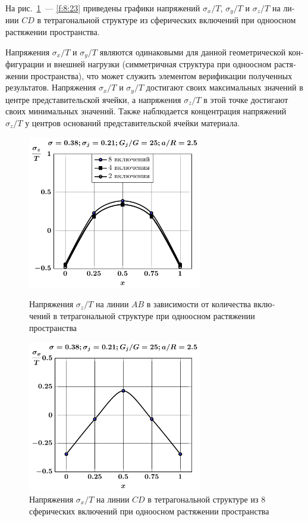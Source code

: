 \begin{russian}
На рис.~\ref{f:8:21}~--- \ref{f:8:23} приведены графики напряжений $\sigma_x/T$, $\sigma_y/T$ и $\sigma_z/T$ на линии $CD$ в тетрагональной структуре из сферических включений при одноосном растяжении пространства.{\sloppy\par}

Напряжения $\sigma_x/T$ и $\sigma_y/T$ являются одинаковыми для данной геометрической конфигурации и внешней нагрузки (симметричная структура при одноосном растяжении пространства), что может служить элементом верификации полученных результатов. Напряжения $\sigma_x/T$ и $\sigma_y/T$ достигают своих максимальных значений в центре представительской ячейки, а напряжения $\sigma_z/T$ в этой точке достигают своих минимальных значений. Также наблюдается концентрация напряжений $\sigma_z/T$ у центров оснований представительской ячейки материала.

\begin{figure}[h!]
\centering\footnotesize
\parbox[b]{7.5cm}{\centering\includegraphics[width=7.6cm]{inc8-4-2-a25-d95-g25-sig_z-spheres-tension1.pdf}
\caption{Напряжения $\sigma_z/T$ на линии  $AB$ в зависимости от количества включений в тетрагональной структуре при одноосном растяжении пространства
\label{f:8:20}}}\hfil\hfil
\parbox[b]{7.5cm}{\centering\includegraphics[width=7.6cm]{inc8-a25-d95-g25-c-c-sig_x-spheres-tension1.pdf}
\caption{Напряжения $\sigma_x/T$ на линии $CD$ в тетрагональной структуре из 8 сферических включений при одноосном растяжении пространства
\label{f:8:21}}}
\end{figure}


\end{russian}

